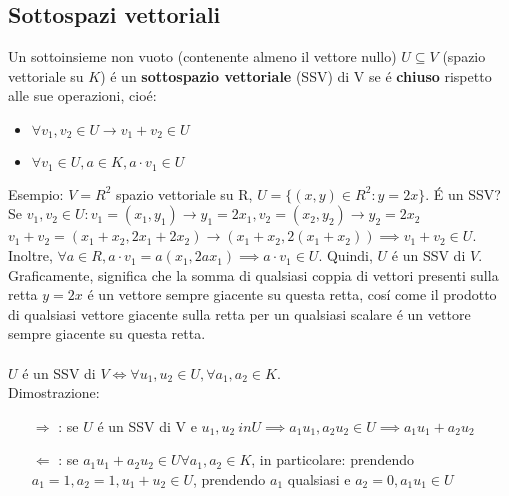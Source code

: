 \documentclass{article}
\begin{document}
\subsection{Sottospazi vettoriali}
Un sottoinsieme non vuoto (contenente almeno il vettore nullo) $U \subseteq V$ (spazio vettoriale su $K$) é un \textbf{sottospazio vettoriale} (SSV) di V se é \textbf{chiuso} rispetto alle sue operazioni, cioé:
\begin{itemize}
	\item $\forall v_1, v_2 \in U \rightarrow v_1 + v_2 \in U$
	\item $\forall v_1 \in U, a \in K, a \cdot v_1 \in U$
\end{itemize}
Esempio: $V = R^2$ spazio vettoriale su R, $U = \{(x,y) \in R^2 : y = 2x\}$. É un SSV?\\
Se $v_1, v_2 \in U: v_1 = (x_1, y_1) \rightarrow y_1 = 2x_1, v_2 = (x_2, y_2) \rightarrow y_2 = 2x_2$\\
$v_1 + v_2 = (x_1 + x_2, 2x_1 + 2x_2) \rightarrow (x_1 + x_2, 2(x_1 + x_2)) \implies v_1 + v_2 \in U$. Inoltre, $\forall a \in R, a \cdot v_1 = a(x_1, 2ax_1) \implies a \cdot v_1 \in U$. Quindi, $U$ é un SSV di $V$.\\
Graficamente, significa che la somma di qualsiasi coppia di vettori presenti sulla retta $y=2x$ é un vettore sempre giacente su questa retta, cosí come il prodotto di qualsiasi vettore giacente sulla retta per un qualsiasi scalare é un vettore sempre giacente su questa retta.\\\\
$U$ é un SSV di $V \iff \forall u_1, u_2 \in U, \forall a_1, a_2 \in K$.\\
Dimostrazione:
\begin{itemize}
	\item[$\Rightarrow$]: se $U$ é un SSV di V e $u_1, u_2 \ in U \implies a_1 u_1, a_2 u_2 \in U \implies a_1 u_1 + a_2 u_2$
	\item[$\Leftarrow$]: se $a_1 u_1 + a_2 u_2 \in U \forall a_1, a_2 \in K$, in particolare: prendendo $a_1 = 1, a_2 = 1, u_1 + u_2 \in U$, prendendo $a_1$ qualsiasi e $a_2 = 0, a_1 u_1 \in U$
\end{itemize}
\end{document}
